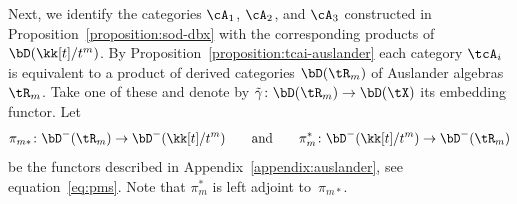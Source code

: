 \documentclass[11pt]{amsart}
\theoremstyle{plain}
\theoremstyle{definition}
\theoremstyle{remark}
\begin{document}
Next, we identify the categories $\cA_1$, $\cA_2$, and $\cA_3$ constructed in Proposition~\ref{proposition:sod-dbx} 
with the corresponding products of $\bD(\kk[t]/t^m)$.
By Proposition~\ref{proposition:tcai-auslander} each category $\tcA_i$ is equivalent to a product of derived categories $\bD(\tR_m)$ of Auslander algebras $\tR_m$.
Take one of these and denote by $\tilde\gamma \colon \bD(\tR_m) \to \bD(\tX)$ its embedding functor.
Let 
\begin{equation*}
\pi_{m*} \colon \bD^-(\tR_m) \to \bD^-(\kk[t]/t^m)
\qquad \text{and} \qquad
\pi_m^* \colon \bD^-(\kk[t]/t^m) \to \bD^-(\tR_m)
\end{equation*}
be the functors described in Appendix~\ref{appendix:auslander}, see equation~\eqref{eq:pms}.
Note that $\pi_m^*$ is left adjoint to~$\pi_{m*}$.
\end{document}
